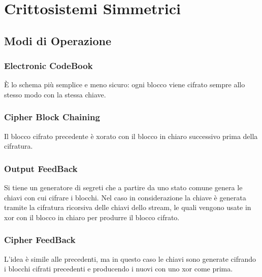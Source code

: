 \chapter{Crittosistemi Simmetrici}

\section{Modi di Operazione}

\subsection{Electronic CodeBook}

\`E lo schema pi\`u semplice e meno sicuro: ogni blocco viene cifrato sempre allo stesso modo con la stessa chiave.


\subsection{Cipher Block Chaining}

Il blocco cifrato precedente \`e xorato con il blocco in chiaro successivo prima della cifratura.


\subsection{Output FeedBack}

Si tiene un generatore di segreti che a partire da uno stato comune genera le chiavi con cui cifrare i blocchi. Nel caso in considerazione la chiave \`e generata tramite la cifratura ricorsiva delle chiavi dello stream, le quali vengono usate in xor con il blocco in chiaro per produrre il blocco cifrato.


\subsection{Cipher FeedBack}

L'idea \`e simile alle precedenti, ma in questo caso le chiavi sono generate cifrando i blocchi cifrati precedenti e producendo i nuovi con uno xor come prima.


